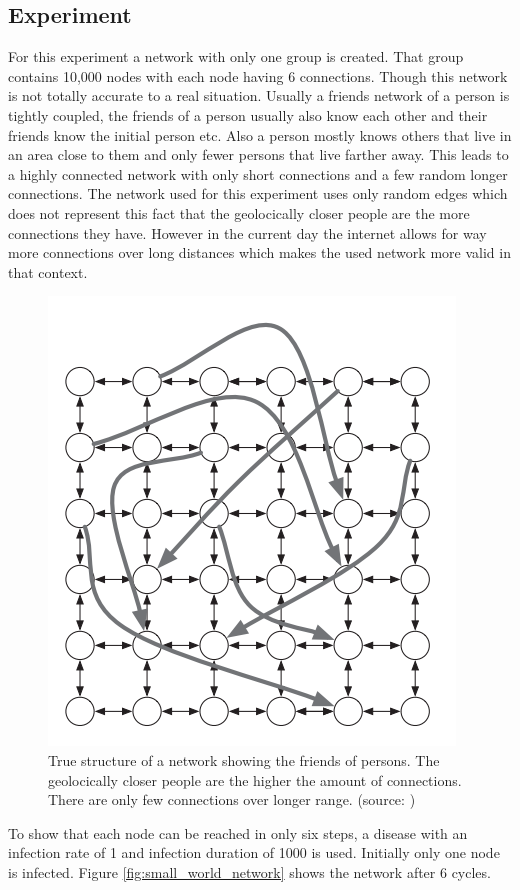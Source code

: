 \subsection{Experiment}
For this experiment a network with only one group is created. That group contains 10,000 nodes with each node having 6 connections. Though this network is not totally accurate to a real situation. Usually a friends network of a person is tightly coupled, the friends of a person usually also know
each other and their friends know the initial person etc. Also a person mostly knows others that live in an area close to them and only fewer persons that live farther away. This leads to a highly connected network with only short connections and a few random longer connections. The network used for this experiment uses only random edges which does not represent this fact that the geolocically closer people are the more connections they have. However in the current day the internet allows for way more connections over long distances which makes the used network more valid in that context.

\begin{figure}
    \centering
    \includegraphics[width=0.5\linewidth]{images/sw_true_network.png}
    \caption{True structure of a network showing the friends of persons. The
    geolocically closer people are the higher the amount of connections. There
    are only few connections over longer range. (source: \cite{networks})}
    \label{fig:oscillation}
\end{figure}


To show that each node can be reached in only six steps, a disease with an infection rate of 1 and infection duration of 1000 is used. Initially only one node is infected. Figure \ref{fig:small_world_network} shows the network after 6 cycles.

